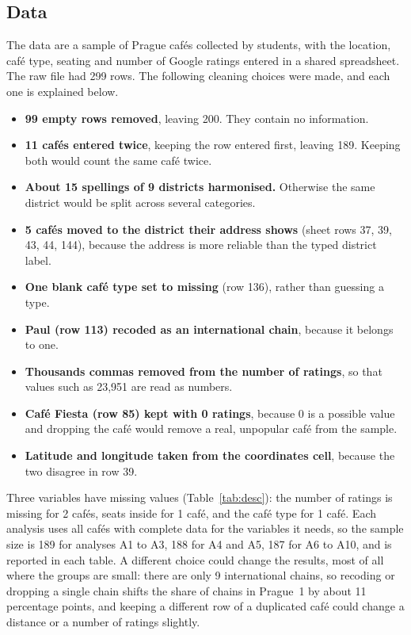 \documentclass[11pt,a4paper]{article}
\begin{document}
\subsection{Data}
The data are a sample of Prague caf\'es collected by students, with the location, caf\'e type, seating and number of Google ratings entered in a shared spreadsheet. The raw file had 299 rows. The following cleaning choices were made, and each one is explained below.
\begin{itemize}
\item \textbf{99 empty rows removed}, leaving 200. They contain no information.
\item \textbf{11 caf\'es entered twice}, keeping the row entered first, leaving 189. Keeping both would count the same caf\'e twice.
\item \textbf{About 15 spellings of 9 districts harmonised.} Otherwise the same district would be split across several categories.
\item \textbf{5 caf\'es moved to the district their address shows} (sheet rows 37, 39, 43, 44, 144), because the address is more reliable than the typed district label.
\item \textbf{One blank caf\'e type set to missing} (row 136), rather than guessing a type.
\item \textbf{Paul (row 113) recoded as an international chain}, because it belongs to one.
\item \textbf{Thousands commas removed from the number of ratings}, so that values such as 23,951 are read as numbers.
\item \textbf{Caf\'e Fiesta (row 85) kept with 0 ratings}, because 0 is a possible value and dropping the caf\'e would remove a real, unpopular caf\'e from the sample.
\item \textbf{Latitude and longitude taken from the coordinates cell}, because the two disagree in row 39.
\end{itemize}
Three variables have missing values (Table~\ref{tab:desc}): the number of ratings is missing for 2 caf\'es, seats inside for 1 caf\'e, and the caf\'e type for 1 caf\'e. Each analysis uses all caf\'es with complete data for the variables it needs, so the sample size is 189 for analyses A1 to A3, 188 for A4 and A5, 187 for A6 to A10, and is reported in each table. A different choice could change the results, most of all where the groups are small: there are only 9 international chains, so recoding or dropping a single chain shifts the share of chains in Prague~1 by about 11 percentage points, and keeping a different row of a duplicated caf\'e could change a distance or a number of ratings slightly.
\end{document}
